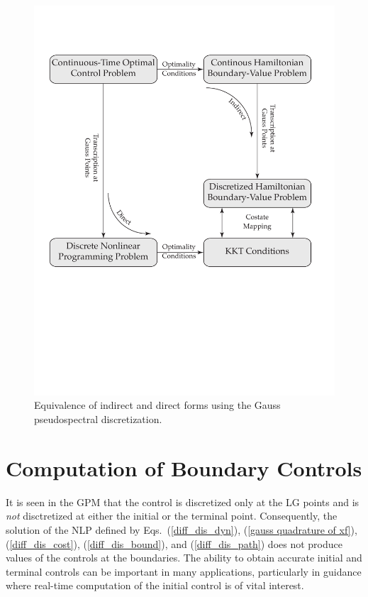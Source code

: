 \documentclass[10pt,final]{report}
\begin{document}
\begin{figure}[h]
  \centering
  \includegraphics[scale=0.7]{diff_flow.pdf}
  \caption{Equivalence of indirect and direct forms using the Gauss pseudospectral discretization.\label{diff_flow_fig}}
\end{figure}

\section{Computation of Boundary Controls}

It is seen in the GPM that the control is discretized only at the LG points
and is {\em not} disctretized at either the initial or the terminal point.
Consequently, the solution of the NLP defined by Eqs.~(\ref{diff_dis_dyn}),
(\ref{gauss quadrature of xf}), (\ref{diff_dis_cost}), (\ref{diff_dis_bound}),
and (\ref{diff_dis_path}) does not produce values of the controls at the
boundaries.  The ability to obtain accurate initial and terminal controls can
be important in many applications, particularly in guidance where real-time
computation of the initial control is of vital interest.
\end{document}
